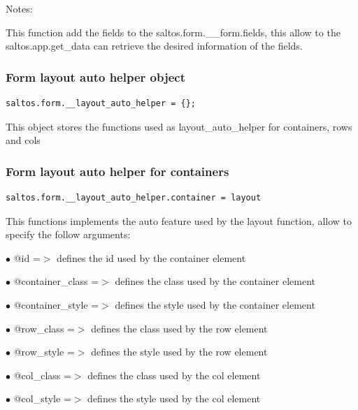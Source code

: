 \documentclass[a4paper]{article}
\begin{document}
Notes:

This function add the fields to the saltos.form.\_\_form.fields, this allow to the saltos.app.get\_data
can retrieve the desired information of the fields.

\hypertarget{toc223}{}
\subsubsection{Form layout auto helper object}

\begin{lstlisting}
saltos.form.__layout_auto_helper = {};
\end{lstlisting}

This object stores the functions used as layout\_auto\_helper for containers, rows and cols

\hypertarget{toc224}{}
\subsubsection{Form layout auto helper for containers}

\begin{lstlisting}
saltos.form.__layout_auto_helper.container = layout
\end{lstlisting}

This functions implements the auto feature used by the layout function, allow to specify the
follow arguments:

\begin{compactitem}
\item[\color{myblue}$\bullet$] @id              =$>$ defines the id used by the container element
\item[\color{myblue}$\bullet$] @container\_class =$>$ defines the class used by the container element
\item[\color{myblue}$\bullet$] @container\_style =$>$ defines the style used by the container element
\item[\color{myblue}$\bullet$] @row\_class       =$>$ defines the class used by the row element
\item[\color{myblue}$\bullet$] @row\_style       =$>$ defines the style used by the row element
\item[\color{myblue}$\bullet$] @col\_class       =$>$ defines the class used by the col element
\item[\color{myblue}$\bullet$] @col\_style       =$>$ defines the style used by the col element
\end{compactitem}
\end{document}
